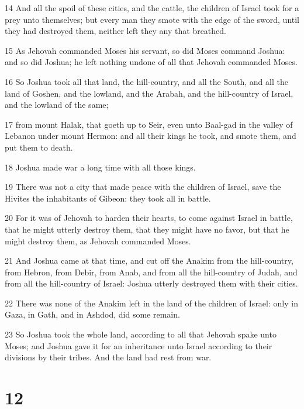 \par 14 And all the spoil of these cities, and the cattle, the children of Israel took for a prey unto themselves; but every man they smote with the edge of the sword, until they had destroyed them, neither left they any that breathed.
\par 15 As Jehovah commanded Moses his servant, so did Moses command Joshua: and so did Joshua; he left nothing undone of all that Jehovah commanded Moses.
\par 16 So Joshua took all that land, the hill-country, and all the South, and all the land of Goshen, and the lowland, and the Arabah, and the hill-country of Israel, and the lowland of the same;
\par 17 from mount Halak, that goeth up to Seir, even unto Baal-gad in the valley of Lebanon under mount Hermon: and all their kings he took, and smote them, and put them to death.
\par 18 Joshua made war a long time with all those kings.
\par 19 There was not a city that made peace with the children of Israel, save the Hivites the inhabitants of Gibeon: they took all in battle.
\par 20 For it was of Jehovah to harden their hearts, to come against Israel in battle, that he might utterly destroy them, that they might have no favor, but that he might destroy them, as Jehovah commanded Moses.
\par 21 And Joshua came at that time, and cut off the Anakim from the hill-country, from Hebron, from Debir, from Anab, and from all the hill-country of Judah, and from all the hill-country of Israel: Joshua utterly destroyed them with their cities.
\par 22 There was none of the Anakim left in the land of the children of Israel: only in Gaza, in Gath, and in Ashdod, did some remain.
\par 23 So Joshua took the whole land, according to all that Jehovah spake unto Moses; and Joshua gave it for an inheritance unto Israel according to their divisions by their tribes. And the land had rest from war.

\chapter{12}

